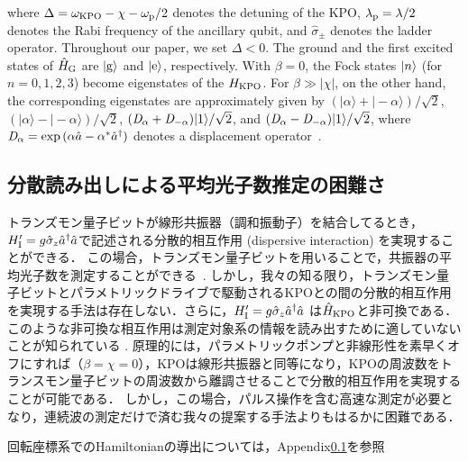 where $\Delta = \omega_{\rm{KPO}} -\chi - \omega_{\rm{p}}/2$ denotes the detuning of the KPO,  $\lambda_{\rm{p}}={\lambda}/{2}$ denotes the Rabi frequency of the ancillary qubit, and $\hat{\sigma}_{\pm}$ denotes the ladder operator.
Throughout our paper, we set $\Delta <0$.
The ground and the first excited states of $\hat{H}_{\rm{G}}$ are $|{\rm{g}}\rangle $ and $|{\rm{e}}\rangle $, respectively. With $\beta =0$, %
the Fock states
$\ket{n}$ (for $n=0,1,2, 3$) become eigenstates of the
$H_{\rm{KPO}}$. For $\beta \gg |\chi|$, on the other hand, the corresponding eigenstates are approximately given by $(|\alpha \rangle+ |-\alpha \rangle )/\sqrt{2}$, $(|\alpha \rangle- |-\alpha \rangle )/\sqrt{2}$, $({\it{D}}_{\alpha}+{\it{D}}_{-\alpha})|1\rangle /\sqrt{2}$, and 
$({\it{D}}_{\alpha}-{\it{D}}_{-\alpha})|1\rangle /\sqrt{2}$, where ${\it{D}}_{ \alpha}=\exp{(\alpha\hat{a}-\alpha^{\ast}\hat{a}^\dagger)}$
denotes a displacement operator~\cite{goto2016bifurcation}.



\subsection{分散読み出しによる平均光子数推定の困難さ}
トランズモン量子ビットが線形共振器（調和振動子）を結合してるとき，$H'_{\rm{I}}=g \hat{\sigma}_z \hat{a}^{\dagger} \hat{a}$で記述される分散的相互作用 (dispersive interaction) を実現することができる．
この場合，トランズモン量子ビットを用いることで，共振器の平均光子数を測定することができる~\cite{johnson2010quantum,PhysRevApplied.14.044022,PhysRevX.11.031045,PhysRevA.103.023705}. 
しかし，我々の知る限り，トランズモン量子ビットとパラメトリックドライブで駆動されるKPOとの間の分散的相互作用を実現する手法は存在しない．さらに，$H'_{\rm{I}}=g \hat{\sigma}_z \hat{a}^{\dagger} \hat{a}$ は$\hat{H}_{\rm{KPO}}$と非可換である．このような非可換な相互作用は測定対象系の情報を読み出すために適していないことが知られている \cite{endo2020projecting}.
原理的には，パラメトリックポンプと非線形性を素早くオフにすれば（$\beta=\chi=0$），KPOは線形共振器と同等になり，KPOの周波数をトランスモン量子ビットの周波数から離調させることで分散的相互作用を実現することが可能である． 
しかし，この場合，パルス操作を含む高速な測定が必要となり，連続波の測定だけで済む我々の提案する手法よりもはるかに困難である．


回転座標系でのHamiltonianの導出については，Appendix\ref{}を参照


